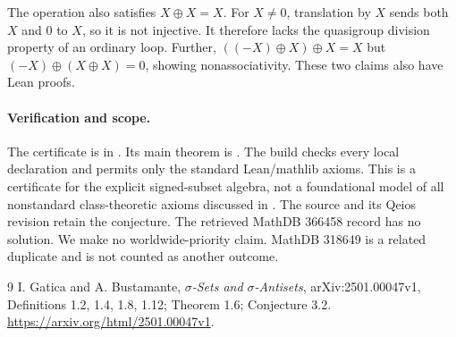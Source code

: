 \documentclass[11pt]{article}
\begin{document}
The operation also satisfies $X\oplus X=X$. For $X\ne0$, translation by $X$
sends both $X$ and $0$ to $X$, so it is not injective. It therefore lacks the
quasigroup division property of an ordinary loop. Further,
$((-X)\oplus X)\oplus X=X$ but $(-X)\oplus(X\oplus X)=0$, showing
nonassociativity. These two claims also have Lean proofs.

\paragraph{Verification and scope.}
The certificate is in .
Its main theorem is .
The build checks every local declaration
and permits only the standard Lean/mathlib axioms. This is a certificate
for the explicit signed-subset algebra, not a foundational model of all
nonstandard class-theoretic axioms discussed in \cite{GB}.
The source and its Qeios revision retain the conjecture. The retrieved
MathDB 366458 record has no solution. We make no worldwide-priority claim.
MathDB 318649 is a related duplicate and is not counted as another outcome.
\begin{thebibliography}{9}
 I. Gatica and A. Bustamante, \emph{$\sigma$-Sets and
$\sigma$-Antisets}, arXiv:2501.00047v1, Definitions 1.2, 1.4, 1.8, 1.12;
Theorem 1.6; Conjecture 3.2.
\url{https://arxiv.org/html/2501.00047v1}.
\end{thebibliography}
\end{document}

